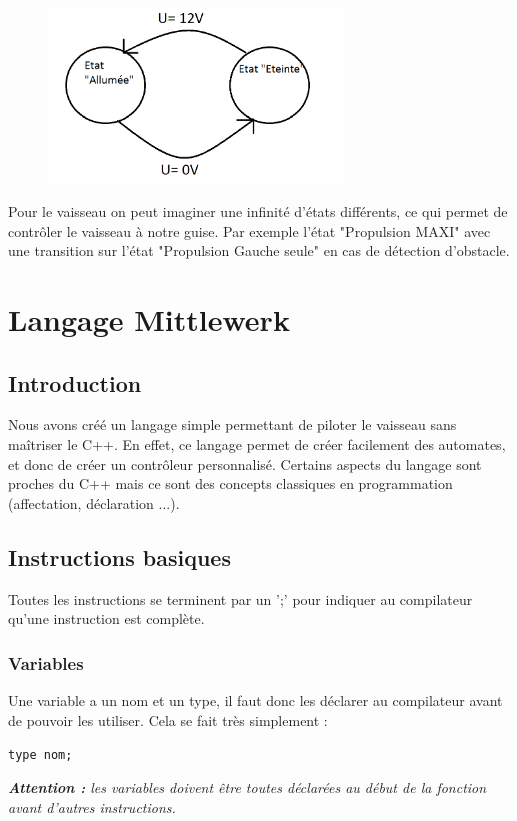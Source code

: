 \documentclass[a4paper,11pt]{article}
\begin{document}
        \begin{figure}[!h]
                    \begin{center}
                        \includegraphics[width=0.7\textwidth]{img/automatelas.png}
                    \end{center}
        \end{figure}

        Pour le vaisseau on peut imaginer une infinité d'états différents, ce qui permet de contrôler le vaisseau à notre guise. Par exemple l'état "Propulsion MAXI" avec une transition sur l'état "Propulsion Gauche seule" en cas de détection d'obstacle.


\section{Langage Mittlewerk}
    \subsection{Introduction}
        Nous avons créé un langage simple permettant de piloter le vaisseau sans maîtriser le C++. En effet, ce langage permet de créer facilement des automates, et donc de créer un contrôleur personnalisé.
        Certains aspects du langage sont proches du C++ mais ce sont des concepts classiques en programmation (affectation, déclaration ...).

    \subsection{Instructions basiques}
        Toutes les instructions se terminent par un ';' pour indiquer au compilateur qu'une instruction est complète.

        \subsubsection{Variables}
            Une variable a un nom et un type, il faut donc les déclarer au compilateur avant de pouvoir les utiliser. Cela se fait très simplement : 
            \begin{center}
                \texttt{type nom;}
            \end{center}
            \textit{\textbf{Attention :} les variables doivent être toutes déclarées au début de la fonction avant d'autres instructions.} 
\end{document}

